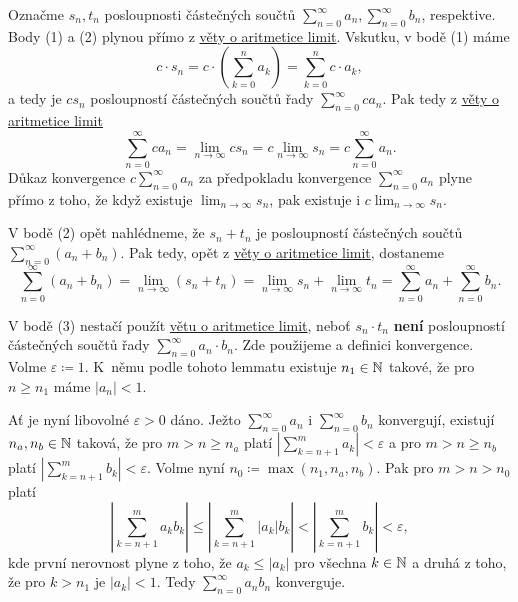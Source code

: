 \begin{propproof}
 Označme $s_n,t_n$ posloupnosti částečných součtů $\sum_{n=0}^{\infty} a_n,
 \sum_{n=0}^{\infty} b_n$, respektive. Body (1) a (2) plynou přímo z
 \hyperref[thm:aritmetika-limit]{věty o aritmetice limit}. Vskutku, v bodě (1)
 máme
 \[
  c \cdot s_n = c \cdot \left( \sum_{k=0}^{n} a_k \right) = \sum_{k=0}^{n} c
  \cdot a_k,
 \]
 a tedy je $cs_n$ posloupností částečných součtů řady $\sum_{n=0}^{\infty}
 ca_n$. Pak tedy z \hyperref[thm:aritmetika-limit]{věty o aritmetice limit}
 \[
  \sum_{n=0}^{\infty} ca_n = \lim_{n \to \infty} cs_n = c \lim_{n \to \infty}
  s_n = c \sum_{n=0}^{\infty} a_n.
 \]
 Důkaz konvergence $c \sum_{n=0}^{\infty} a_n$ za předpokladu konvergence
 $\sum_{n=0}^{\infty} a_n$ plyne přímo z toho, že když existuje $\lim_{n \to
 \infty} s_n$, pak existuje i $c \lim_{n \to \infty} s_n$.

 V bodě (2) opět nahlédneme, že $s_n+t_n$ je posloupností částečných součtů
 $\sum_{n=0}^{\infty} (a_n + b_n)$. Pak tedy, opět z
 \hyperref[thm:aritmetika-limit]{věty o aritmetice limit}, dostaneme
 \[
  \sum_{n=0}^{\infty} (a_n+b_n) = \lim_{n \to \infty} (s_n + t_n) = \lim_{n \to
  \infty} s_n + \lim_{n \to \infty} t_n = \sum_{n=0}^{\infty} a_n +
  \sum_{n=0}^{\infty} b_n.
 \]

 V bodě (3) nestačí použít \hyperref[thm:aritmetika-limit]{větu o aritmetice
 limit}, neboť $s_n \cdot t_n$ \textbf{není} posloupností částečných součtů řady
 $\sum_{n=0}^{\infty} a_n \cdot b_n$. Zde použijeme
  a definici konvergence.
 Volme $\varepsilon \coloneqq 1$. K~němu podle tohoto lemmatu existuje $n_1 \in
 \mathbb{N}$ takové, že pro $n \geq n_1$ máme $|a_n| < 1$.

 Ať je nyní libovolné $\varepsilon>0$ dáno. Ježto $\sum_{n=0}^{\infty} a_n$ i
 $\sum_{n=0}^{\infty} b_n$ konvergují, existují $n_a, n_b \in \mathbb{N}$ taková, že pro
 $m > n \geq n_a$ platí $| \sum_{k=n+1}^{m} a_k | < \varepsilon$ a pro $m > n
 \geq n_b$ platí $| \sum_{k=n+1}^{m} b_k| < \varepsilon$. Volme nyní $n_0
 \coloneqq \max(n_1,n_a,n_b)$. Pak pro $m > n > n_0$ platí
 \[
  \left| \sum_{k=n+1}^{m} a_k b_k \right| \leq \left| \sum_{k=n+1}^{m} |a_k|b_k
  \right| < \left| \sum_{k=n+1}^{m} b_k \right| < \varepsilon,
 \]
 kde první nerovnost plyne z toho, že $a_k \leq |a_k|$ pro všechna $k \in \mathbb{N}$ a
 druhá z toho, že pro $k>n_1$ je $|a_k|<1$. Tedy $\sum_{n=0}^{\infty} a_nb_n$
 konverguje. 
\end{propproof}


